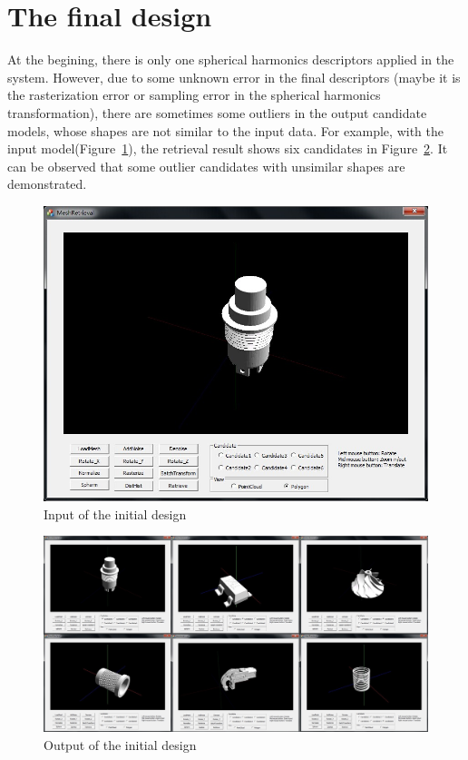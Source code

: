 \section{The final design} \label{sec:thefinaldesign}

At the begining, there is only one spherical harmonics descriptors applied in the system. However, due to some unknown error in the final descriptors (maybe it is the rasterization error or sampling error in the spherical harmonics transformation), there are sometimes some outliers in the output candidate models, whose shapes are not similar to the input data. For example, with the input model(Figure~\ref{input_initialdesign}), the retrieval result shows six candidates in Figure~\ref{output_initialdesign}. It can be observed that some outlier candidates with unsimilar shapes are demonstrated. 


\begin{figure}[h]
\centering
\includegraphics[width=0.7\linewidth]{input_initialdesign}
\caption{Input of the initial design} \label{input_initialdesign}
\end{figure}

\begin{figure}[h]
\centering
\includegraphics[width=0.7\linewidth]{output_initialdesign}
\caption{Output of the initial design} \label{output_initialdesign}
\end{figure}


